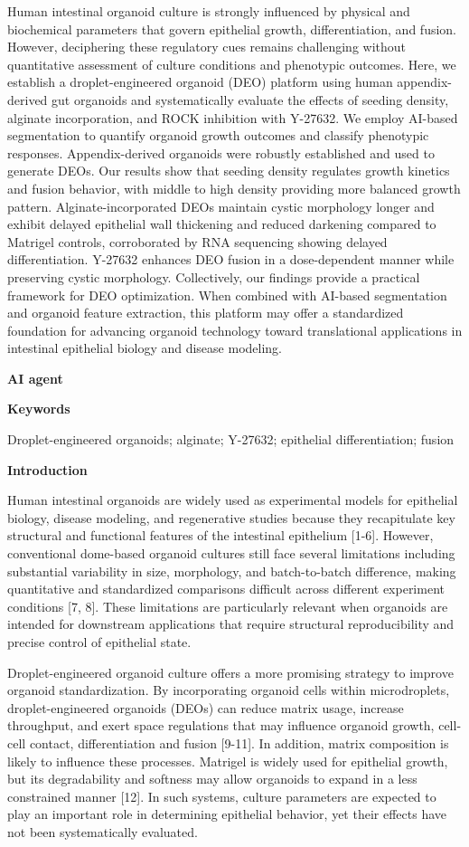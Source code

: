 \documentclass[
]{article}
\begin{document}
Human intestinal organoid culture is strongly influenced by physical and biochemical parameters that govern epithelial growth, differentiation, and fusion. However, deciphering these regulatory cues remains challenging without quantitative assessment of culture conditions and phenotypic outcomes. Here, we establish a droplet-engineered organoid (DEO) platform using human appendix-derived gut organoids and systematically evaluate the effects of seeding density, alginate incorporation, and ROCK inhibition with Y-27632. We employ AI-based segmentation to quantify organoid growth outcomes and classify phenotypic responses. Appendix-derived organoids were robustly established and used to generate DEOs. Our results show that seeding density regulates growth kinetics and fusion behavior, with middle to high density providing more balanced growth pattern. Alginate-incorporated DEOs maintain cystic morphology longer and exhibit delayed epithelial wall thickening and reduced darkening compared to Matrigel controls, corroborated by RNA sequencing showing delayed differentiation. Y-27632 enhances DEO fusion in a dose-dependent manner while preserving cystic morphology. Collectively, our findings provide a practical framework for DEO optimization. When combined with AI-based segmentation and organoid feature extraction, this platform may offer a standardized foundation for advancing organoid technology toward translational applications in intestinal epithelial biology and disease modeling.

\textbf{AI agent}

\textbf{Keywords}

Droplet-engineered organoids; alginate; Y-27632; epithelial differentiation; fusion

\textbf{Introduction}

Human intestinal organoids are widely used as experimental models for epithelial biology, disease modeling, and regenerative studies because they recapitulate key structural and functional features of the intestinal epithelium {[}1-6{]}. However, conventional dome-based organoid cultures still face several limitations including substantial variability in size, morphology, and batch-to-batch difference, making quantitative and standardized comparisons difficult across different experiment conditions {[}7, 8{]}. These limitations are particularly relevant when organoids are intended for downstream applications that require structural reproducibility and precise control of epithelial state.

Droplet-engineered organoid culture offers a more promising strategy to improve organoid standardization. By incorporating organoid cells within microdroplets, droplet-engineered organoids (DEOs) can reduce matrix usage, increase throughput, and exert space regulations that may influence organoid growth, cell-cell contact, differentiation and fusion {[}9-11{]}. In addition, matrix composition is likely to influence these processes. Matrigel is widely used for epithelial growth, but its degradability and softness may allow organoids to expand in a less constrained manner {[}12{]}. In such systems, culture parameters are expected to play an important role in determining epithelial behavior, yet their effects have not been systematically evaluated.
\end{document}
